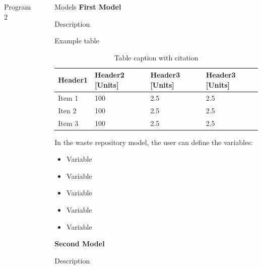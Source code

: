 \documentclass[final]{beamer}
\newlength{\sepwid}
\newlength{\onecolwid}
\newlength{\threecolwid}
\begin{document}
\begin{frame}[t]
\begin{columns}[t,totalwidth=\threecolwid]
\begin{column}{\onecolwid}
\begin{block}{Program 2}
\end{block}


\end{column} %

\begin{column}{\sepwid}\end{column} %



\begin{column}{\onecolwid} %

\begin{block}{Models}
\vspace{0.7em}
\textbf{First Model}

Description

Example table 
\begin{table}[]
	\label{tab:table_label}
	\caption{Table caption with citation \cite{call_tag_article}}
	\begin{tabular}{|l|l|l|l|}
	\hline
	Header1 &  Header2 [Units]  &  Header3 [Units]  &  Header3 [Units]   \\ \hline
	Item 1     & 100 & 2.5  & 2.5\\ \hline
	Iten 2      & 100 & 2.5 & 2.5\\ \hline
	Item 3     & 100 & 2.5  & 2.5\\ \hline
	\end{tabular}
\end{table}

In the waste repository model, the user can define the variables: 
	\begin{itemize}
		\item Variable
		\item Variable
		\item Variable 
		\item Variable 
		\item Variable
	\end{itemize}

\vspace{0.7em}
\textbf{Second Model}

Description 


\end{block}
\end{column}
\end{columns}
\end{frame}
\end{document}
